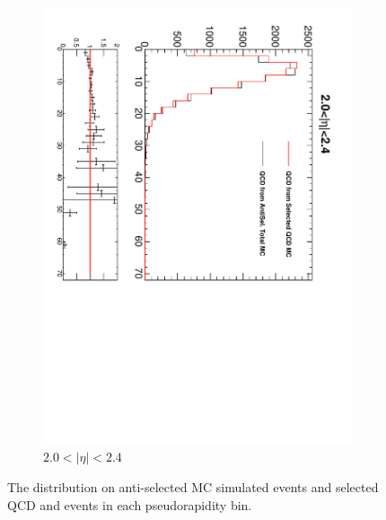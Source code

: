 \begin{figure}[htbp]
\begin{subfigure}{0.45\textwidth}
    \includegraphics*[trim = 0mm 0mm 15mm 0mm, clip, width=\textwidth, angle=90]{MetCompare_anti_eta6.pdf}
    \caption{$2.0<| \eta |<2.4$}
    \label{fig:qcd_met_eta6}
  \end{subfigure}
  \caption{The \ETm distribution on anti-selected {MC} simulated events and selected {QCD} and \gjet events in each pseudorapidity bin\cite{baisini2010electron}.}
  \label{tab:antiselclosure}
\end{figure}

